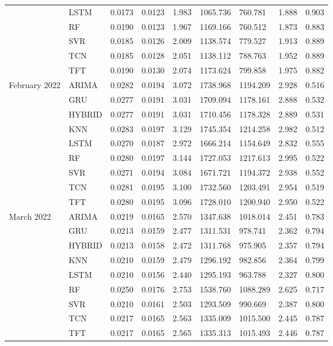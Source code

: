 \begin{tabular}{lllllllll}
 & LSTM & 0.0173 & 0.0123 & 1.983 & 1065.736 & 760.781 & 1.888 & 0.903 \\
 & RF & 0.0190 & 0.0123 & 1.967 & 1169.166 & 760.512 & 1.873 & 0.883 \\
 & SVR & 0.0185 & 0.0126 & 2.009 & 1138.574 & 779.527 & 1.913 & 0.889 \\
 & TCN & 0.0185 & 0.0128 & 2.051 & 1138.112 & 788.763 & 1.952 & 0.889 \\
 & TFT & 0.0190 & 0.0130 & 2.074 & 1173.624 & 799.858 & 1.975 & 0.882 \\
February 2022 & ARIMA & 0.0282 & 0.0194 & 3.072 & 1738.968 & 1194.209 & 2.928 & 0.516 \\
 & GRU & 0.0277 & 0.0191 & 3.031 & 1709.094 & 1178.161 & 2.888 & 0.532 \\
 & HYBRID & 0.0277 & 0.0191 & 3.031 & 1710.456 & 1178.328 & 2.889 & 0.531 \\
 & KNN & 0.0283 & 0.0197 & 3.129 & 1745.354 & 1214.258 & 2.982 & 0.512 \\
 & LSTM & 0.0270 & 0.0187 & 2.972 & 1666.214 & 1154.649 & 2.832 & 0.555 \\
 & RF & 0.0280 & 0.0197 & 3.144 & 1727.053 & 1217.613 & 2.995 & 0.522 \\
 & SVR & 0.0271 & 0.0194 & 3.084 & 1671.721 & 1194.372 & 2.938 & 0.552 \\
 & TCN & 0.0281 & 0.0195 & 3.100 & 1732.560 & 1203.491 & 2.954 & 0.519 \\
 & TFT & 0.0280 & 0.0195 & 3.096 & 1728.010 & 1200.940 & 2.950 & 0.522 \\
March 2022 & ARIMA & 0.0219 & 0.0165 & 2.570 & 1347.638 & 1018.014 & 2.451 & 0.783 \\
 & GRU & 0.0213 & 0.0159 & 2.477 & 1311.531 & 978.741 & 2.362 & 0.794 \\
 & HYBRID & 0.0213 & 0.0158 & 2.472 & 1311.768 & 975.905 & 2.357 & 0.794 \\
 & KNN & 0.0210 & 0.0159 & 2.479 & 1296.192 & 982.856 & 2.364 & 0.799 \\
 & LSTM & 0.0210 & 0.0156 & 2.440 & 1295.193 & 963.788 & 2.327 & 0.800 \\
 & RF & 0.0250 & 0.0176 & 2.753 & 1538.760 & 1088.289 & 2.625 & 0.717 \\
 & SVR & 0.0210 & 0.0161 & 2.503 & 1293.509 & 990.669 & 2.387 & 0.800 \\
 & TCN & 0.0217 & 0.0165 & 2.563 & 1335.009 & 1015.500 & 2.445 & 0.787 \\
 & TFT & 0.0217 & 0.0165 & 2.565 & 1335.313 & 1015.493 & 2.446 & 0.787 \\

\end{tabular}
